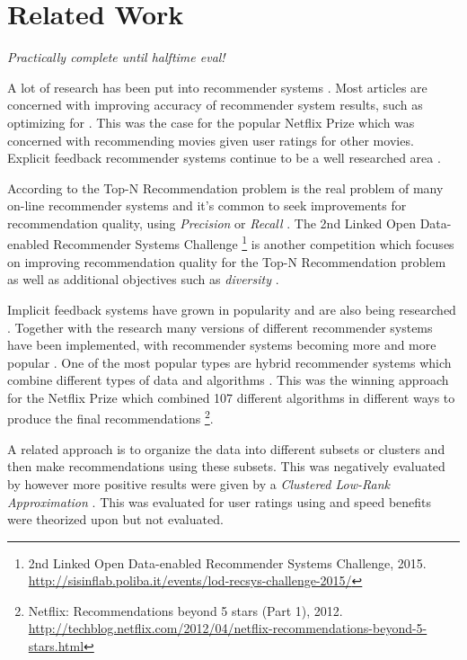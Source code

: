 \chapter{Related Work}\label{cha:relwork}


\textit{Practically complete until halftime eval!}

A lot of research has been put into recommender systems \citep{bobadilla2013recommender}. Most articles are concerned with improving accuracy of recommender system results, such as optimizing for \rmse. This was the case for the popular Netflix Prize \citep{bennett2007netflix} which was concerned with recommending movies given user ratings for other movies. Explicit feedback recommender systems continue to be a well researched area \citep{bobadilla2013recommender}.

According to \citep{lai2012hybrid} the Top-N Recommendation problem is the real problem of many on-line recommender systems and it's common to seek improvements for recommendation quality, using \textit{Precision} or \textit{Recall} \citep{bobadilla2013recommender}. The 2nd Linked Open Data-enabled Recommender Systems Challenge
\footnote{2nd Linked Open Data-enabled Recommender Systems Challenge, 2015. \url{http://sisinflab.poliba.it/events/lod-recsys-challenge-2015/}}
is another competition which focuses on improving recommendation quality for the Top-N Recommendation problem as well as additional objectives such as \textit{diversity} \citep{bobadilla2013recommender}.

Implicit feedback systems have grown in popularity and are also being researched \citep{hu2008collaborative, bobadilla2013recommender}. Together with the research many versions of different recommender systems have been implemented, with recommender systems becoming more and more popular \citep{bobadilla2013recommender}. One of the most popular types are hybrid recommender systems which combine different types of data and algorithms \citep{bobadilla2013recommender, lai2012hybrid}. This was the winning approach for the Netflix Prize which combined 107 different algorithms in different ways to produce the final recommendations
\footnote{ Netflix: Recommendations beyond 5 stars (Part 1), 2012. \url{http://techblog.netflix.com/2012/04/netflix-recommendations-beyond-5-stars.html} }.

A related approach is to organize the data into different subsets or clusters and then make recommendations using these subsets. This was negatively evaluated by \citep{cacheda2011comparison} however more positive results were given by a \textit{Clustered Low-Rank Approximation} \citep{niklas, savas2011clustered}.  This was evaluated for user ratings using \rmse and speed benefits were theorized upon but not evaluated.

